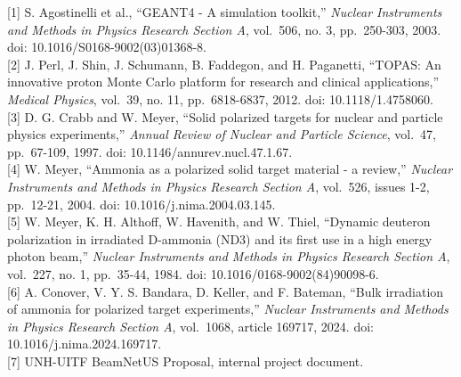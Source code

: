 \documentclass[
  12pt,
]{article}
\begin{document}
{[}1{]} S. Agostinelli et al., ``GEANT4 - A simulation toolkit,''
\emph{Nuclear Instruments and Methods in Physics Research Section A},
vol.~506, no. 3, pp.~250-303, 2003. doi:
10.1016/S0168-9002(03)01368-8.\\
{[}2{]} J. Perl, J. Shin, J. Schumann, B. Faddegon, and H. Paganetti,
``TOPAS: An innovative proton Monte Carlo platform for research and
clinical applications,'' \emph{Medical Physics}, vol.~39, no. 11,
pp.~6818-6837, 2012. doi: 10.1118/1.4758060.\\
{[}3{]} D. G. Crabb and W. Meyer, ``Solid polarized targets for nuclear
and particle physics experiments,'' \emph{Annual Review of Nuclear and
Particle Science}, vol.~47, pp.~67-109, 1997. doi:
10.1146/annurev.nucl.47.1.67.\\
{[}4{]} W. Meyer, ``Ammonia as a polarized solid target material - a
review,'' \emph{Nuclear Instruments and Methods in Physics Research
Section A}, vol.~526, issues 1-2, pp.~12-21, 2004. doi:
10.1016/j.nima.2004.03.145.\\
{[}5{]} W. Meyer, K. H. Althoff, W. Havenith, and W. Thiel, ``Dynamic
deuteron polarization in irradiated D-ammonia (ND3) and its first use in
a high energy photon beam,'' \emph{Nuclear Instruments and Methods in
Physics Research Section A}, vol.~227, no. 1, pp.~35-44, 1984. doi:
10.1016/0168-9002(84)90098-6.\\
{[}6{]} A. Conover, V. Y. S. Bandara, D. Keller, and F. Bateman, ``Bulk
irradiation of ammonia for polarized target experiments,'' \emph{Nuclear
Instruments and Methods in Physics Research Section A}, vol.~1068,
article 169717, 2024. doi: 10.1016/j.nima.2024.169717.\\
{[}7{]} UNH-UITF BeamNetUS Proposal, internal project document.
\end{document}
